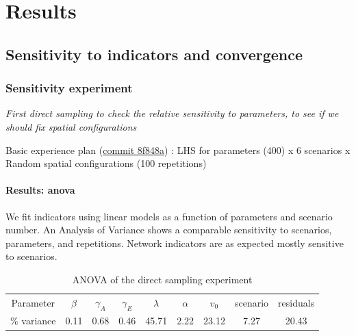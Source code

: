 \section{Results}


\subsection{Sensitivity to indicators and convergence}

\subsubsection{Sensitivity experiment}

\textit{First direct sampling to check the relative sensitivity to parameters, to see if we should fix spatial configurations}

Basic experience plan (\href{https://github.com/JusteRaimbault/Governance/commit/8f848a20abca8c51b927e18c1aaf1ad3434af2cb}{commit 8f848a}) :
LHS for parameters (400) x 6 scenarios x Random spatial configurations (100 repetitions)


\paragraph{Results: anova}

We fit indicators using linear models as a function of parameters and scenario number. An Analysis of Variance shows a comparable sensitivity to scenarios, parameters, and repetitions. Network indicators are as expected mostly sensitive to scenarios.


\begin{table}
\caption{ANOVA of the direct sampling experiment}
\begin{center}
\begin{tabular}{|c|c|c|c|c|c|c|c|c|}
\hline
Parameter & $\beta$ & $\gamma_A$ & $\gamma_E$ & $\lambda$ & $\alpha$ & $v_0$ & scenario & residuals \\
\% variance & 0.11 & 0.68 & 0.46 & 45.71 & 2.22 & 23.12 & 7.27 & 20.43 \\
\hline
\end{tabular}
\end{center}
\end{table}

